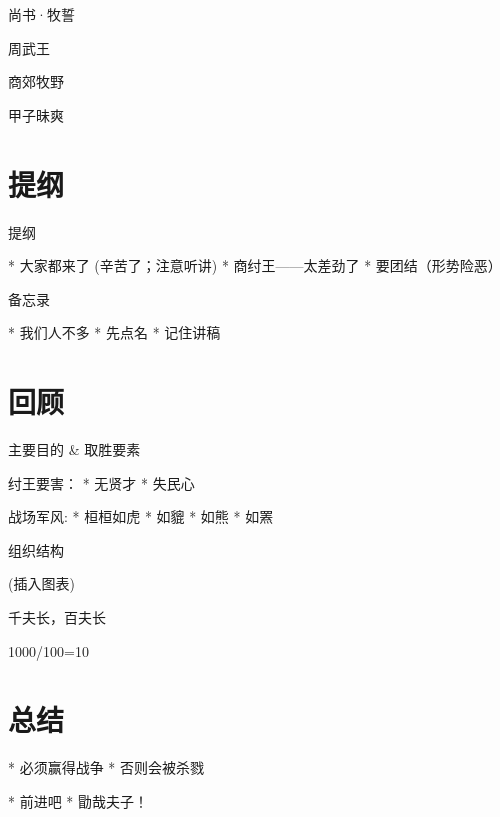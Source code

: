 \documentclass{beamer}
\begin{document}
尚书·牧誓

周武王

商郊牧野

甲子昧爽 %

\section{提纲}

提纲

  * 大家都来了 (辛苦了；注意听讲)
  * 商纣王——太差劲了
  * 要团结（形势险恶）

备忘录

  * 我们人不多
  * 先点名
  * 记住讲稿

\section{回顾}

主要目的 \& 取胜要素

纣王要害：
  * 无贤才
  * 失民心

战场军风:
  * 桓桓如虎
  * 如貔
  * 如熊
  * 如罴

组织结构

(插入图表)

千夫长，百夫长

1000/100=10

\section{总结}

* 必须赢得战争
* 否则会被杀戮

* 前进吧
* 勖哉夫子！
\end{document}
